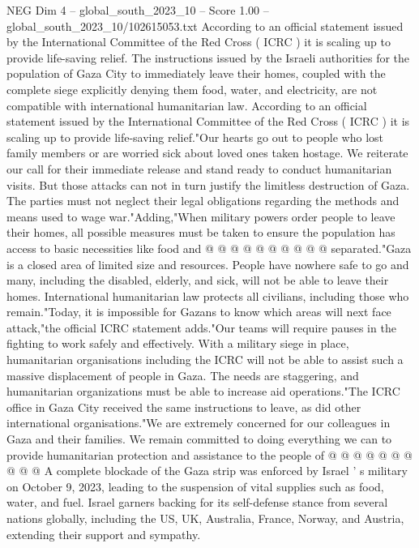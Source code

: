 \begin{textsample}{NEG Dim 4 – global\_south\_2023\_10 – Score 1.00 – global\_south\_2023\_10/102615053.txt}  \label{ex:f4_neg_026}
According to an official statement issued by the International Committee of the Red Cross ( ICRC ) it is scaling up to provide life-saving relief.
The instructions issued by the Israeli authorities for the population of Gaza City to immediately leave their homes, coupled with the complete siege explicitly denying them food, water, and electricity, are not compatible with international humanitarian law.
According to an official statement issued by the International Committee of the Red Cross ( ICRC ) it is scaling up to provide life-saving relief."Our hearts go out to people who lost family members or are worried sick about loved ones taken hostage.
We reiterate our call for their immediate release and stand ready to conduct humanitarian visits.
But those attacks can not in turn justify the limitless destruction of Gaza.
The parties must not neglect their legal obligations regarding the methods and means used to wage war."Adding,"When military powers order people to leave their homes, all possible measures must be taken to ensure the population has access to basic necessities like food and @ @ @ @ @ @ @ @ @ @ separated."Gaza is a closed area of limited size and resources.
People have nowhere safe to go and many, including the disabled, elderly, and sick, will not be able to leave their homes.
International humanitarian law protects all civilians, including those who remain."Today, it is impossible for Gazans to know which areas will next face attack,"the official ICRC statement adds."Our teams will require pauses in the fighting to work safely and effectively.
With a military siege in place, humanitarian organisations including the ICRC will not be able to assist such a massive displacement of people in Gaza.
The needs are staggering, and humanitarian organizations must be able to increase aid operations."The ICRC office in Gaza City received the same instructions to leave, as did other international organisations."We are extremely concerned for our colleagues in Gaza and their families.
We remain committed to doing everything we can to provide humanitarian protection and assistance to the people of @ @ @ @ @ @ @ @ @ @ A complete blockade of the Gaza strip was enforced by Israel ' s military on October 9, 2023, leading to the suspension of vital supplies such as food, water, and fuel.
Israel garners backing for its self-defense stance from several nations globally, including the US, UK, Australia, France, Norway, and Austria, extending their support and sympathy.

\end{textsample}
